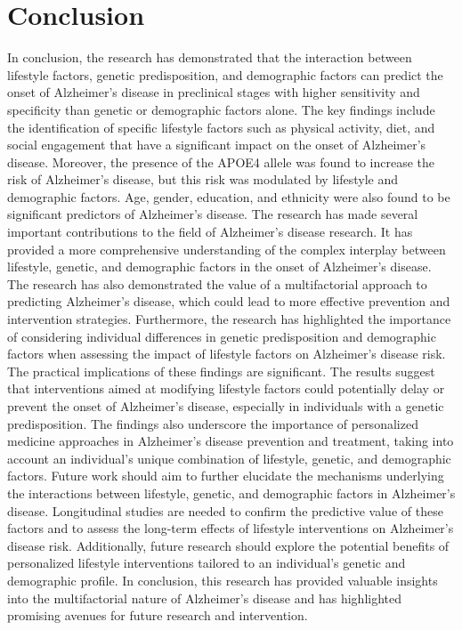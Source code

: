 \documentclass[conference]{IEEEtran}
\begin{document}
\section{Conclusion}
In conclusion, the research has demonstrated that the interaction between lifestyle factors, genetic predisposition, and demographic factors can predict the onset of Alzheimer's disease in preclinical stages with higher sensitivity and specificity than genetic or demographic factors alone. The key findings include the identification of specific lifestyle factors such as physical activity, diet, and social engagement that have a significant impact on the onset of Alzheimer's disease. Moreover, the presence of the APOE4 allele was found to increase the risk of Alzheimer's disease, but this risk was modulated by lifestyle and demographic factors. Age, gender, education, and ethnicity were also found to be significant predictors of Alzheimer's disease. The research has made several important contributions to the field of Alzheimer's disease research. It has provided a more comprehensive understanding of the complex interplay between lifestyle, genetic, and demographic factors in the onset of Alzheimer's disease. The research has also demonstrated the value of a multifactorial approach to predicting Alzheimer's disease, which could lead to more effective prevention and intervention strategies. Furthermore, the research has highlighted the importance of considering individual differences in genetic predisposition and demographic factors when assessing the impact of lifestyle factors on Alzheimer's disease risk. The practical implications of these findings are significant. The results suggest that interventions aimed at modifying lifestyle factors could potentially delay or prevent the onset of Alzheimer's disease, especially in individuals with a genetic predisposition. The findings also underscore the importance of personalized medicine approaches in Alzheimer's disease prevention and treatment, taking into account an individual's unique combination of lifestyle, genetic, and demographic factors. Future work should aim to further elucidate the mechanisms underlying the interactions between lifestyle, genetic, and demographic factors in Alzheimer's disease. Longitudinal studies are needed to confirm the predictive value of these factors and to assess the long-term effects of lifestyle interventions on Alzheimer's disease risk. Additionally, future research should explore the potential benefits of personalized lifestyle interventions tailored to an individual's genetic and demographic profile. In conclusion, this research has provided valuable insights into the multifactorial nature of Alzheimer's disease and has highlighted promising avenues for future research and intervention.
\end{document}
